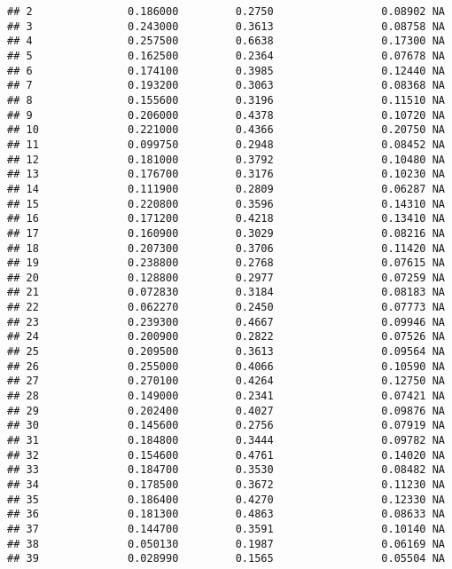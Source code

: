 \documentclass[
]{article}
\begin{document}
\begin{verbatim}
## 2               0.186000         0.2750                 0.08902 NA
## 3               0.243000         0.3613                 0.08758 NA
## 4               0.257500         0.6638                 0.17300 NA
## 5               0.162500         0.2364                 0.07678 NA
## 6               0.174100         0.3985                 0.12440 NA
## 7               0.193200         0.3063                 0.08368 NA
## 8               0.155600         0.3196                 0.11510 NA
## 9               0.206000         0.4378                 0.10720 NA
## 10              0.221000         0.4366                 0.20750 NA
## 11              0.099750         0.2948                 0.08452 NA
## 12              0.181000         0.3792                 0.10480 NA
## 13              0.176700         0.3176                 0.10230 NA
## 14              0.111900         0.2809                 0.06287 NA
## 15              0.220800         0.3596                 0.14310 NA
## 16              0.171200         0.4218                 0.13410 NA
## 17              0.160900         0.3029                 0.08216 NA
## 18              0.207300         0.3706                 0.11420 NA
## 19              0.238800         0.2768                 0.07615 NA
## 20              0.128800         0.2977                 0.07259 NA
## 21              0.072830         0.3184                 0.08183 NA
## 22              0.062270         0.2450                 0.07773 NA
## 23              0.239300         0.4667                 0.09946 NA
## 24              0.200900         0.2822                 0.07526 NA
## 25              0.209500         0.3613                 0.09564 NA
## 26              0.255000         0.4066                 0.10590 NA
## 27              0.270100         0.4264                 0.12750 NA
## 28              0.149000         0.2341                 0.07421 NA
## 29              0.202400         0.4027                 0.09876 NA
## 30              0.145600         0.2756                 0.07919 NA
## 31              0.184800         0.3444                 0.09782 NA
## 32              0.154600         0.4761                 0.14020 NA
## 33              0.184700         0.3530                 0.08482 NA
## 34              0.178500         0.3672                 0.11230 NA
## 35              0.186400         0.4270                 0.12330 NA
## 36              0.181300         0.4863                 0.08633 NA
## 37              0.144700         0.3591                 0.10140 NA
## 38              0.050130         0.1987                 0.06169 NA
## 39              0.028990         0.1565                 0.05504 NA

\end{verbatim}
\end{document}
